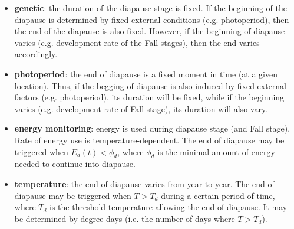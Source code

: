 \documentclass[12 pt]{article}
\begin{document}
\begin{itemize}
    \item \textbf{genetic}: the duration of the diapause stage is fixed. If the beginning of the diapause is determined by fixed external conditions (e.g. photoperiod), then the end of the diapause is also fixed. However, if the beginning of diapause varies (e.g. development rate of the Fall stages), then the end varies accordingly. 
    \item \textbf{photoperiod}: the end of diapause is a fixed moment in time (at a given location). Thus, if the begging of diapause is also induced by fixed external factors (e.g. photoperiod), its duration will be fixed, while if the beginning varies (e.g. development rate of Fall stage), its duration will also vary.
   \item \textbf{energy monitoring}: energy is used during diapause stage (and Fall stage). Rate of energy use is temperature-dependent. The end of diapause may be triggered when $E_d(t)<\phi _d$, where $\phi _d$ is the minimal amount of energy needed to continue into diapause.
    \item \textbf{temperature}: the end of diapause varies from year to year. The end of diapause may be triggered when $T> T_d$ during a certain period of time, where $T_d$ is the threshold temperature allowing the end of diapause. It may be determined by degree-days (i.e. the number of days where $T> T_d$).
\end{itemize}
\end{document}
